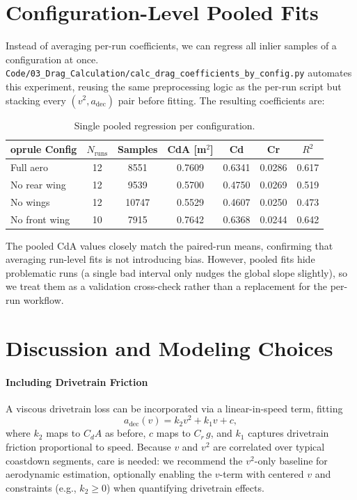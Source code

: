 \documentclass[11pt,a4paper]{article}
\begin{document}
\section{Configuration-Level Pooled Fits}
Instead of averaging per-run coefficients, we can regress all inlier samples of a configuration at once. \texttt{Code/03\_Drag\_Calculation/calc\_drag\_coefficients\_by\_config.py} automates this experiment, reusing the same preprocessing logic as the per-run script but stacking every $(v^2, a_\text{dec})$ pair before fitting. The resulting coefficients are:
\begin{table}[h]
  \centering
  \begin{tabular}{l c S[table-format=2.0] S[table-format=1.4] S[table-format=1.4] S[table-format=1.4] S[table-format=1.3]}
    	oprule
    {Config} & {$N_\text{runs}$} & {Samples} & {CdA [m$^2$]} & {Cd} & {Cr} & {$R^2$} \\
    \midrule
    Full aero        & 12 & 8551  & 0.7609 & 0.6341 & 0.0286 & 0.617 \\
    No rear wing     & 12 & 9539  & 0.5700 & 0.4750 & 0.0269 & 0.519 \\
    No wings         & 12 & 10747 & 0.5529 & 0.4607 & 0.0250 & 0.473 \\
    No front wing    & 10 & 7915  & 0.7642 & 0.6368 & 0.0244 & 0.642 \\
    \bottomrule
  \end{tabular}
  \caption{Single pooled regression per configuration.}
\end{table}

The pooled CdA values closely match the paired-run means, confirming that averaging run-level fits is not introducing bias. However, pooled fits hide problematic runs (a single bad interval only nudges the global slope slightly), so we treat them as a validation cross-check rather than a replacement for the per-run workflow.

\section{Discussion and Modeling Choices}
\paragraph{Including Drivetrain Friction} A viscous drivetrain loss can be incorporated via a linear-in-speed term, fitting
\begin{equation}
  a_\text{dec}(v) = k_2 v^2 + k_1 v + c,
\end{equation}
where \(k_2\) maps to \(C_dA\) as before, \(c\) maps to \(C_r\,g\), and \(k_1\) captures drivetrain friction proportional to speed. Because \(v\) and \(v^2\) are correlated over typical coastdown segments, care is needed: we recommend the \(v^2\)-only baseline for aerodynamic estimation, optionally enabling the \(v\)-term with centered \(v\) and constraints (e.g., \(k_2\ge 0\)) when quantifying drivetrain effects.
\end{document}

